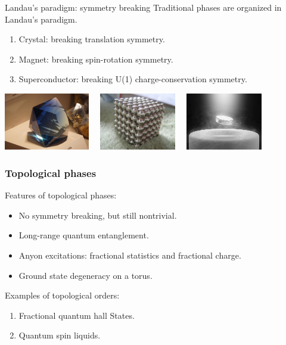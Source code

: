 \documentclass[xcolor=table, 10pt, aspectratio=43]{beamer}
\begin{document}
\begin{frame}{Landau's paradigm: symmetry breaking}
  Traditional phases are organized in Landau's paradigm.
  \begin{enumerate}
  \item Crystal: breaking translation symmetry.
  \item Magnet: breaking spin-rotation symmetry.
  \item Superconductor: breaking U(1) charge-conservation symmetry.
  \end{enumerate}
  \begin{center}
    \includegraphics[height=2.5cm]{../resources/crystal}~~
    \includegraphics[height=2.5cm]{../resources/magnet}~~
    \includegraphics[height=2.5cm]{../resources/sc}
  \end{center}
\end{frame}

\begin{frame}
  \frametitle{Topological phases}
  Features of topological phases:
  \begin{itemize}
  \item No symmetry breaking, but still nontrivial.
  \item Long-range quantum entanglement.
  \item Anyon excitations: fractional statistics and fractional charge.
  \item Ground state degeneracy on a torus.
  \end{itemize}
  Examples of topological orders:
  \begin{enumerate}
  \item Fractional quantum hall States.
  \item Quantum spin liquids.
\end{enumerate}
\end{frame}
\end{document}
